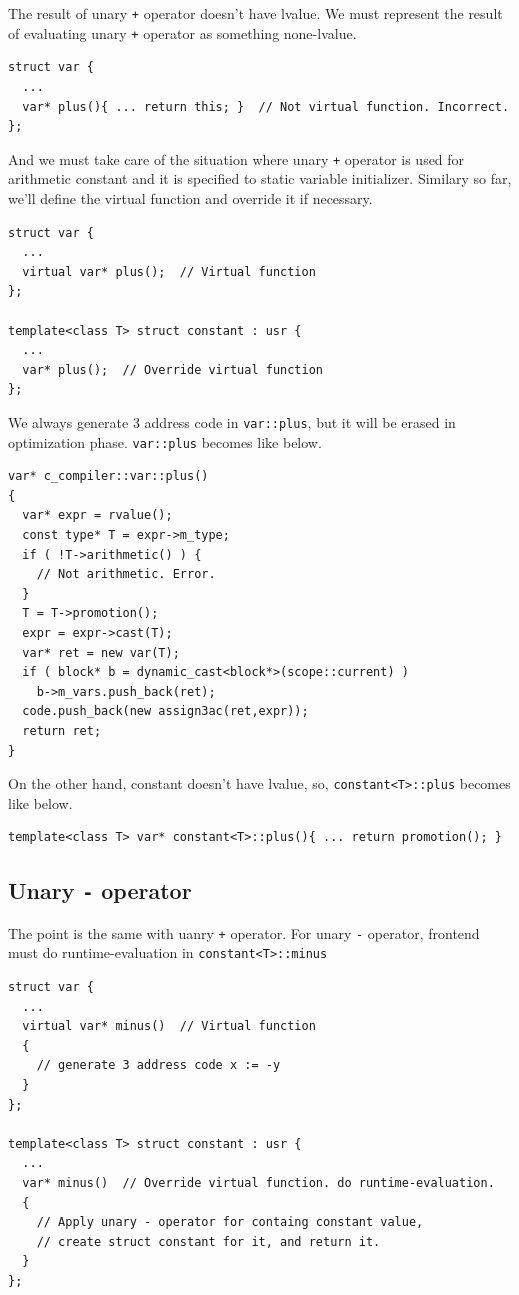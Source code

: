 The result of unary {\tt{+}} operator doesn't have lvalue.
We must represent the result of evaluating unary {\tt{+}} operator
as something none-lvalue.
\begin{verbatim}
struct var {
  ...
  var* plus(){ ... return this; }  // Not virtual function. Incorrect.
};
\end{verbatim}
And we must take care of the situation where unary {\tt{+}} operator
is used for arithmetic constant and it is specified to static 
variable initializer. Similary so far, we'll define the virtual function
and override it if necessary.
\begin{verbatim}
struct var {
  ...
  virtual var* plus();  // Virtual function
};

template<class T> struct constant : usr {
  ...
  var* plus();  // Override virtual function
};
\end{verbatim}
We always generate 3 address code in {\tt{var::plus}},
but it will be erased in optimization phase.
{\tt{var::plus}} becomes like below.
\begin{verbatim}
var* c_compiler::var::plus()
{
  var* expr = rvalue();
  const type* T = expr->m_type;
  if ( !T->arithmetic() ) {
    // Not arithmetic. Error.
  }
  T = T->promotion();
  expr = expr->cast(T);
  var* ret = new var(T);
  if ( block* b = dynamic_cast<block*>(scope::current) )
    b->m_vars.push_back(ret);
  code.push_back(new assign3ac(ret,expr));
  return ret;
}
\end{verbatim}
On the other hand, constant doesn't have lvalue, so,
{\tt{constant<T>::plus}} becomes like below.
\begin{verbatim}
template<class T> var* constant<T>::plus(){ ... return promotion(); }
\end{verbatim}

\subsection{Unary {\tt{-}} operator}
The point is the same with uanry {\tt{+}} operator.
For unary {\tt{-}} operator, frontend must do runtime-evaluation
in {\tt{constant<T>::minus}}
\begin{verbatim}
struct var {
  ...
  virtual var* minus()  // Virtual function
  {
    // generate 3 address code x := -y
  }
};

template<class T> struct constant : usr {
  ...
  var* minus()  // Override virtual function. do runtime-evaluation.
  {
    // Apply unary - operator for containg constant value,
    // create struct constant for it, and return it.
  }
};
\end{verbatim}

